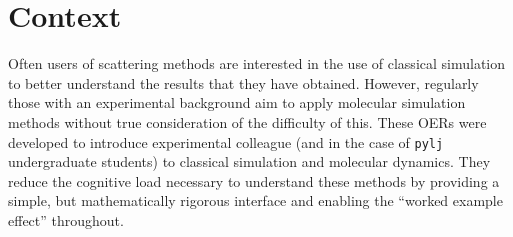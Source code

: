 \section*{Context}
Often users of scattering methods are interested in the use of classical simulation to better understand the results that they have obtained.
However, regularly those with an experimental background aim to apply molecular simulation methods without true consideration of the difficulty of this.
These OERs were developed to introduce experimental colleague (and in the case of \texttt{pylj} undergraduate students) to classical simulation and molecular dynamics.
They reduce the cognitive load necessary to understand these methods by providing a simple, but mathematically rigorous interface and enabling the ``worked example effect'' throughout.
